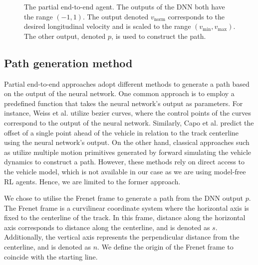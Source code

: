 \begin{figure}[htb!]
    \centering
    
    \caption[The partial end-to-end planner agent]{The partial end-to-end agent. The outputs of the DNN both have the range $(-1,1)$. The output denoted $v_{\text{norm}}$ corresponds to the desired longitudinal velocity and is scaled to the range $(v_{\text{min}}, v_{\text{max}})$. The other output, denoted $p$, is used to construct the path.}
    \label{fig:steer_vel_agent}
\end{figure}


\subsection{Path generation method}\label{sec:path_construction}

Partial end-to-end approaches adopt different methods to generate a path based on the output of the neural network. 
One common approach is to employ a predefined function that takes the neural network's output as parameters. 
For instance, Weiss et al. \cite{Weiss2020a} utilize bezier curves, where the control points of the curves correspond to the output of the neural network. 
Similarly, Capo et al. \cite{Capo2020} predict the offset of a single point ahead of the vehicle in relation to the track centerline using the neural network's output.
On the other hand, classical approaches such as \cite{keefer2022, Liniger2015a, Wang2021} utilize multiple motion primitives generated by forward simulating the vehicle dynamics to construct a path. 
However, these methods rely on direct access to the vehicle model, which is not available in our case as we are using model-free RL agents.
Hence, we are limited to the former approach.


We chose to utilise the Frenet frame \cite{Stahl2019} to generate a path from the DNN output $p$.
The Frenet frame is a curvilinear coordinate system where the horizontal axis is fixed to the centerline of the track. 
In this frame, distance along the horizontal axis corresponds to distance along the centerline, and is denoted as $s$. 
Additionally, the vertical axis represents the perpendicular distance from the centerline, and is denoted as $n$.
We define the origin of the Frenet frame to coincide with the starting line.


